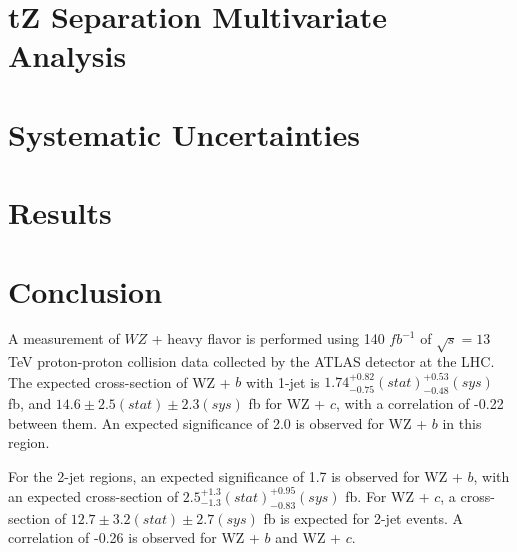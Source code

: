 \documentclass[12pt]{report}	%
\theoremstyle{definition}
\theoremstyle{remark}
\begin{document}
\section{tZ Separation Multivariate Analysis}
\label{sec:tZ_bdt}


\section{Systematic Uncertainties}
\label{sec:sys}
                                                                              
                                                                                                                             
\section{Results}
\label{sec:results}                                                                                                          


\section{Conclusion}
\label{sec:conclusion}

A measurement of $WZ$ + heavy flavor is performed using 140 $fb^{-1}$ of $\sqrt{s} = 13$ TeV proton-proton collision data collected by the ATLAS detector at the LHC. The expected cross-section of WZ + $b$ with 1-jet is $1.74^{+0.82}_{-0.75}(stat)^{+0.53}_{-0.48}(sys)$ fb, and $14.6 \pm 2.5 (stat) \pm 2.3 (sys)$ fb for WZ + $c$, with a correlation of -0.22 between them. An expected significance of 2.0 is observed for WZ + $b$ in this region.

For the 2-jet regions, an expected significance of 1.7 is observed for WZ + $b$, with an expected cross-section of $2.5^{+1.3}_{-1.3}(stat)^{+0.95}_{-0.83}(sys)$ fb. For WZ + $c$, a cross-section of $12.7 \pm 3.2 (stat) \pm 2.7 (sys)$ fb is expected for 2-jet events. A correlation of -0.26 is observed for WZ + $b$ and WZ + $c$.
\end{document}
